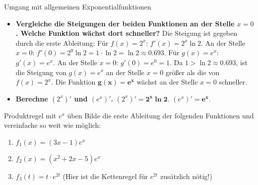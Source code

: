 \begin{loesungsumgebung}{Umgang mit allgemeinen Exponentialfunktionen}
\begin{enumerate}[label=(\alph*)]
\begin{itemize}
        \item \textbf{Vergleiche die Steigungen der beiden Funktionen an der Stelle $x=0$. Welche Funktion wächst dort schneller?}
        Die Steigung ist gegeben durch die erste Ableitung:
        Für $f(x)=2^x$: $f'(x) = 2^x \ln 2$.
        An der Stelle $x=0$: $f'(0) = 2^0 \ln 2 = 1 \cdot \ln 2 = \ln 2 \approx 0.693$.
        Für $g(x)=e^x$: $g'(x) = e^x$.
        An der Stelle $x=0$: $g'(0) = e^0 = 1$.
        Da $1 > \ln 2 \approx 0.693$, ist die Steigung von $g(x)=e^x$ an der Stelle $x=0$ größer als die von $f(x)=2^x$.
        Die Funktion $\mathbf{g(x)=e^x}$ wächst an der Stelle $x=0$ schneller.

        \item \textbf{Berechne $(2^x)'$ und $(e^x)'$.}
        $(2^x)' = \mathbf{2^x \ln 2}$.
        $(e^x)' = \mathbf{e^x}$.
    \end{itemize}
\end{enumerate}

\end{loesungsumgebung}


\begin{aufgabenumgebung}{Produktregel mit $e^x$ üben}
Bilde die erste Ableitung der folgenden Funktionen und vereinfache so weit wie möglich:
\begin{enumerate}
    \item $f_1(x) = (3x-1)e^x$
    \item $f_2(x) = (x^2+2x-5)e^x$
    \item $f_3(t) = t \cdot e^{2t}$ (Hier ist die Kettenregel für $e^{2t}$ zusätzlich nötig!)
\end{enumerate}
\end{aufgabenumgebung}

